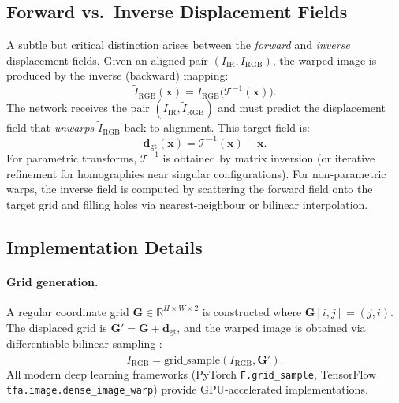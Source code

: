 \subsection{Forward vs.\ Inverse Displacement Fields}
\label{subsec:forward_inverse}

A subtle but critical distinction arises between the \emph{forward} and
\emph{inverse} displacement fields.  Given an aligned pair
$(I_{\mathrm{IR}}, I_{\mathrm{RGB}})$, the warped image is produced by the
inverse (backward) mapping:
\begin{equation}
    \tilde{I}_{\mathrm{RGB}}(\mathbf{x})
    = I_{\mathrm{RGB}}\!\bigl(\mathcal{T}^{-1}(\mathbf{x})\bigr).
    \label{eq:backward_warp}
\end{equation}
The network receives the pair $(I_{\mathrm{IR}}, \tilde{I}_{\mathrm{RGB}})$
and must predict the displacement field that \emph{unwarps}
$\tilde{I}_{\mathrm{RGB}}$ back to alignment.  This target field is:
\begin{equation}
    \mathbf{d}_{\mathrm{gt}}(\mathbf{x})
    = \mathcal{T}^{-1}(\mathbf{x}) - \mathbf{x}.
    \label{eq:gt_field}
\end{equation}
For parametric transforms, $\mathcal{T}^{-1}$ is obtained by matrix inversion
(or iterative refinement for homographies near singular configurations).
For non-parametric warps, the inverse field is computed by scattering the
forward field onto the target grid and filling holes via nearest-neighbour or
bilinear interpolation.

\subsection{Implementation Details}
\label{subsec:implementation}

\paragraph{Grid generation.}
A regular coordinate grid $\mathbf{G} \in \mathbb{R}^{H \times W \times 2}$
is constructed where $\mathbf{G}[i,j] = (j, i)$.  The displaced grid is
$\mathbf{G}' = \mathbf{G} + \mathbf{d}_{\mathrm{gt}}$, and the warped image
is obtained via differentiable bilinear sampling
\cite{jaderberg2015spatial}:
\begin{equation}
    \tilde{I}_{\mathrm{RGB}} = \mathrm{grid\_sample}(I_{\mathrm{RGB}},
    \mathbf{G}').
    \label{eq:grid_sample}
\end{equation}
All modern deep learning frameworks (PyTorch \texttt{F.grid\_sample},
TensorFlow \texttt{tfa.image.dense\_image\_warp}) provide GPU-accelerated
implementations.

